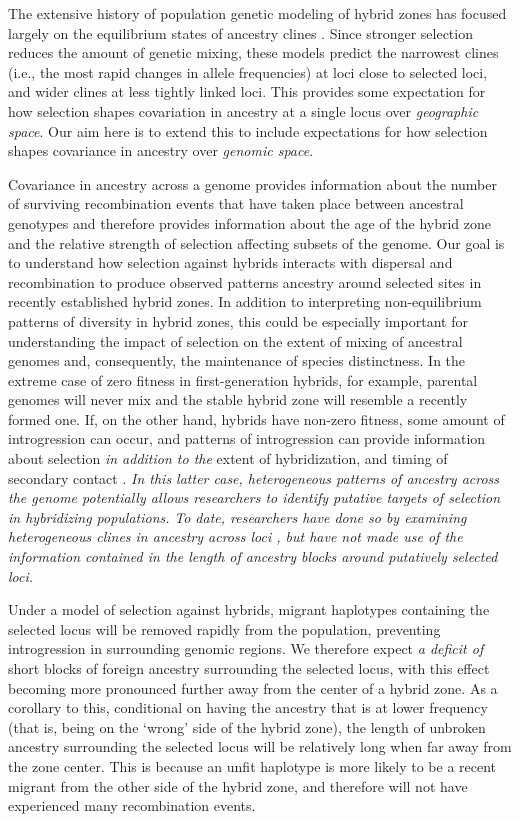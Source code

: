 \documentclass[11pt,letterpaper]{article}
\newcommand{\yb}[1]{{\em \color{magenta} #1}}
\begin{document}
The extensive history of population genetic modeling of hybrid zones has focused largely on the equilibrium states of ancestry clines \citep{Barton1979a,Barton1986}.  
Since stronger selection reduces the amount of genetic mixing,
these models predict the narrowest clines 
(i.e., the most rapid changes in allele frequencies)
at loci close to selected loci, and wider clines at less tightly linked loci.
This provides some expectation for how selection shapes covariation in ancestry at a single locus over \emph{geographic space}.
Our aim here is to extend this to include expectations for how selection shapes covariance in ancestry over \emph{genomic space}.

Covariance in ancestry across a genome provides information about the number of surviving recombination events that have taken place between ancestral genotypes and therefore provides information about the age of the hybrid zone and the relative strength of selection affecting subsets of the genome. Our goal is to understand how selection against hybrids interacts with dispersal and recombination to produce observed patterns ancestry around selected sites in recently established hybrid zones. In addition to interpreting non-equilibrium patterns of diversity in hybrid zones, this could be especially important for understanding the impact of selection on the extent of mixing of ancestral genomes and, consequently, the maintenance of species distinctness. In the extreme case of zero fitness in first-generation hybrids, for example, parental genomes will never mix and the stable hybrid zone will resemble a recently formed one. 
If, on the other hand, hybrids have non-zero fitness, some amount of introgression can occur, and  patterns of introgression can provide information about selection \yb{in addition to the} extent of hybridization, and timing of secondary contact \citep{Price2009, Hellenthal2014}. 
\yb{In this latter case, heterogeneous patterns of ancestry across the genome potentially allows researchers to identify putative targets of selection in hybridizing populations.}  
\yb{To date, researchers have done so by examining heterogeneous clines in ancestry across loci \citep{Porter1997, Gompert2012}, but have not made use of the information contained in the length of ancestry blocks around putatively selected loci.}  

Under a model of selection against hybrids, migrant haplotypes containing the selected locus will be removed rapidly from the population, preventing introgression in surrounding genomic regions. We therefore expect \yb{a deficit of} short blocks of foreign ancestry surrounding the selected locus, with this effect becoming more pronounced further away from the center of a hybrid zone. As a corollary to this, conditional on having the ancestry that is at lower frequency (that is, being on the `wrong' side of the hybrid zone), the length of unbroken ancestry surrounding the selected locus will be relatively long when far away from the zone center.  This is because an unfit haplotype is more likely to be a recent migrant from the other side of the hybrid zone, and therefore will not have experienced many recombination events. 
\end{document}
